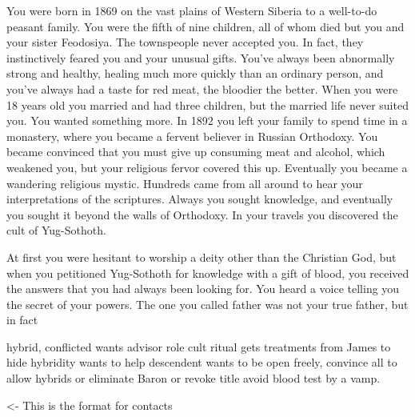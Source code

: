 \documentclass[char]{guildcamp4}
\begin{document}
\name{\cRasputin{}}

You were born in 1869 on the vast plains of Western Siberia to a well-to-do peasant family. You were the fifth of nine children, all of whom died but you and your sister Feodosiya. The townspeople never accepted you. In fact, they instinctively feared you and your unusual gifts. You've always been abnormally strong and healthy, healing much more quickly than an ordinary person, and you've always had a taste for red meat, the bloodier the better. When you were 18 years old you married and had three children, but the married life never suited you. You wanted something more. In 1892 you left your family to spend time in a monastery, where you became a fervent believer in Russian Orthodoxy. You became convinced that you must give up consuming meat and alcohol, which weakened you, but your religious fervor covered this up. Eventually you became a wandering religious mystic. Hundreds came from all around to hear your interpretations of the scriptures. Always you sought knowledge, and eventually you sought it beyond the walls of Orthodoxy. In your travels you discovered the cult of Yug-Sothoth.

At first you were hesitant to worship a deity other than the Christian God, but when you petitioned Yug-Sothoth for knowledge with a gift of blood, you received the answers that you had always been looking for. You heard a voice telling you the secret of your powers. The one you called father was not your true father, but in fact

hybrid, conflicted
wants advisor role
cult ritual
gets treatments from James to hide hybridity
wants to help descendent
wants to be open freely, convince all to allow hybrids or eliminate Baron or revoke title
avoid blood test by a vamp.

\begin{itemz}[Goals]
	\item 
\end{itemz}

\begin{itemz}[Notes]
	\item 
\end{itemz}

\begin{contacts}
	\contact{\cTest{}} <- This is the format for contacts 
\end{contacts}
\end{document}
